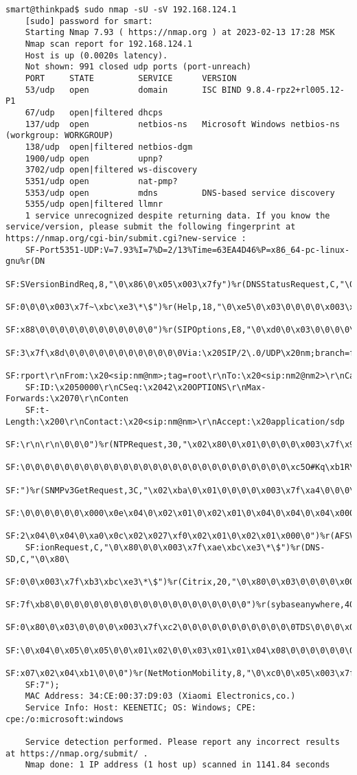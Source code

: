 \begin{Verbatim}[frame=single]
    smart@thinkpad$ sudo nmap -sU -sV 192.168.124.1
    [sudo] password for smart: 
    Starting Nmap 7.93 ( https://nmap.org ) at 2023-02-13 17:28 MSK
    Nmap scan report for 192.168.124.1
    Host is up (0.0020s latency).
    Not shown: 991 closed udp ports (port-unreach)
    PORT     STATE         SERVICE      VERSION
    53/udp   open          domain       ISC BIND 9.8.4-rpz2+rl005.12-P1
    67/udp   open|filtered dhcps
    137/udp  open          netbios-ns   Microsoft Windows netbios-ns (workgroup: WORKGROUP)
    138/udp  open|filtered netbios-dgm
    1900/udp open          upnp?
    3702/udp open|filtered ws-discovery
    5351/udp open          nat-pmp?
    5353/udp open          mdns         DNS-based service discovery
    5355/udp open|filtered llmnr
    1 service unrecognized despite returning data. If you know the service/version, please submit the following fingerprint at https://nmap.org/cgi-bin/submit.cgi?new-service :
    SF-Port5351-UDP:V=7.93%I=7%D=2/13%Time=63EA4D46%P=x86_64-pc-linux-gnu%r(DN
    SF:SVersionBindReq,8,"\0\x86\0\x05\x003\x7fy")%r(DNSStatusRequest,C,"\0\x8
    SF:0\0\0\x003\x7f~\xbc\xe3\*\$")%r(Help,18,"\0\xe5\0\x03\0\0\0\0\x003\x7f\
    SF:x88\0\0\0\0\0\0\0\0\0\0\0\0")%r(SIPOptions,E8,"\0\xd0\0\x03\0\0\0\0\x00
    SF:3\x7f\x8d\0\0\0\0\0\0\0\0\0\0\0\0Via:\x20SIP/2\.0/UDP\x20nm;branch=foo;
    SF:rport\r\nFrom:\x20<sip:nm@nm>;tag=root\r\nTo:\x20<sip:nm2@nm2>\r\nCall-
    SF:ID:\x2050000\r\nCSeq:\x2042\x20OPTIONS\r\nMax-Forwards:\x2070\r\nConten
    SF:t-Length:\x200\r\nContact:\x20<sip:nm@nm>\r\nAccept:\x20application/sdp
    SF:\r\n\r\n\0\0\0")%r(NTPRequest,30,"\x02\x80\0\x01\0\0\0\0\x003\x7f\x9a\0
    SF:\0\0\0\0\0\0\0\0\0\0\0\0\0\0\0\0\0\0\0\0\0\0\0\0\0\0\0\xc5O#Kq\xb1R\xf3
    SF:")%r(SNMPv3GetRequest,3C,"\x02\xba\0\x01\0\0\0\0\x003\x7f\xa4\0\0\0\0\0
    SF:\0\0\0\0\0\0\x000\x0e\x04\0\x02\x01\0\x02\x01\0\x04\0\x04\0\x04\x000\x1
    SF:2\x04\0\x04\0\xa0\x0c\x02\x027\xf0\x02\x01\0\x02\x01\x000\0")%r(AFSVers
    SF:ionRequest,C,"\0\x80\0\0\x003\x7f\xae\xbc\xe3\*\$")%r(DNS-SD,C,"\0\x80\
    SF:0\0\x003\x7f\xb3\xbc\xe3\*\$")%r(Citrix,20,"\0\x80\0\x03\0\0\0\0\x003\x
    SF:7f\xb8\0\0\0\0\0\0\0\0\0\0\0\0\0\0\0\0\0\0\0\0")%r(sybaseanywhere,40,"\
    SF:0\x80\0\x03\0\0\0\0\x003\x7f\xc2\0\0\0\0\0\0\0\0\0\0\0\0TDS\0\0\0\x01\0
    SF:\0\x04\0\x05\0\x05\0\0\x01\x02\0\0\x03\x01\x01\x04\x08\0\0\0\0\0\0\0\0\
    SF:x07\x02\x04\xb1\0\0\0")%r(NetMotionMobility,8,"\0\xc0\0\x05\x003\x7f\xc
    SF:7");
    MAC Address: 34:CE:00:37:D9:03 (Xiaomi Electronics,co.)
    Service Info: Host: KEENETIC; OS: Windows; CPE: cpe:/o:microsoft:windows

    Service detection performed. Please report any incorrect results at https://nmap.org/submit/ .
    Nmap done: 1 IP address (1 host up) scanned in 1141.84 seconds
\end{Verbatim}

